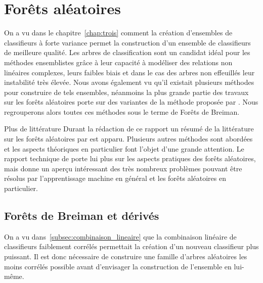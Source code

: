 
\section{Forêts aléatoires}

On a vu dans le chapitre~\ref{chap:trois} comment la création d'ensembles de classifieurs à forte variance permet la construction d'un ensemble de classifieurs de meilleure qualité. Les arbres de classification sont un candidat idéal pour les méthodes ensemblistes grâce à leur capacité à modéliser des relations non linéaires complexes, leurs faibles biais et dans le cas des arbres non effeuillés leur instabilité très élevée. Nous avons également vu qu'il existait plusieurs méthodes pour construire de tels ensembles, néanmoins la plus grande partie des travaux sur les forêts aléatoires porte sur des variantes de la méthode proposée par \citet{Breiman2001}. Nous regrouperons alors toutes ces méthodes sous le terme de Forêts de Breiman.

\begin{remark}{Plus de littérature}
Durant la rédaction de ce rapport un résumé de la littérature sur les forêts aléatoires par \citet{Biau2015} est apparu. Plusieurs autres méthodes sont abordées et les aspects théoriques en particulier font l'objet d'une grande attention. Le rapport technique de \citet{Criminisi2012} porte lui plus sur les aspects pratiques des forêts aléatoires, mais donne un aperçu intéressant des très nombreux problèmes pouvant être résolus par l'apprentissage machine en général et les forêts aléatoires en particulier.
\end{remark}

\subsection{Forêts de Breiman et dérivés}

On a vu dans~\ref{subsec:combinaison_lineaire} que la combinaison linéaire de classifieurs faiblement corrélés permettait la création d'un nouveau classifieur plus puissant. Il est donc nécessaire de construire une famille d'arbres aléatoires les moins corrélés possible avant d'envisager la construction de l'ensemble en lui-même. 

